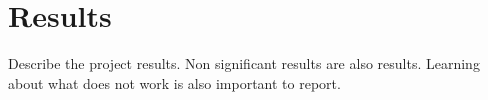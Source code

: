 \chapter{Results}

Describe the project results. Non significant results 
are also results. Learning about
what does not work is also important to report.